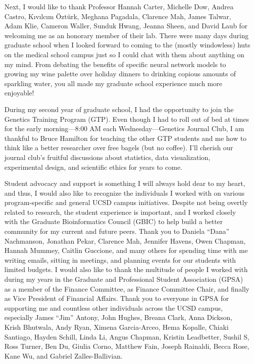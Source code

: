\documentclass[11pt]{formatting-template}
\begin{document}
\begin{acknowledgements}
	Next, I would like to thank Professor Hannah Carter, Michelle Dow, Andrea Castro, K{\i}v{\i}lc{\i}m {\"O}zt{\"u}rk, Meghana Pagadala, Clarence Mah, James Talwar, Adam Klie, Cameron Waller, Sunduk Hwang, Jeanna Sheen, and David Laub for welcoming me as an honorary member of their lab. There were many days during graduate school when I looked forward to coming to the (mostly windowless) huts on the medical school campus just so I could chat with them about anything on my mind. From debating the benefits of specific neural network models to growing my wine palette over holiday dinners to drinking copious amounts of sparkling water, you all made my graduate school experience much more enjoyable!  
	
	During my second year of graduate school, I had the opportunity to join the Genetics Training Program (GTP). Even though I had to roll out of bed at times for the early morning—8:00 AM each Wednesday—Genetics Journal Club, I am thankful to Bruce Hamilton for teaching the other GTP students and me how to think like a better researcher over free bagels (but no coffee). I’ll cherish our journal club's fruitful discussions about statistics, data visualization, experimental design, and scientific ethics for years to come.
	
	Student advocacy and support is something I will always hold dear to my heart, and thus, I would also like to recognize the individuals I worked with on various program-specific and general UCSD campus initiatives. Despite not being overtly related to research, the student experience is important, and I worked closely with the Graduate Bioinformatics Council (GBIC) to help build a better community for my current and future peers. Thank you to Daniela “Dana” Nachmanson, Jonathan Pekar, Clarence Mah, Jennifer Havens, Owen Chapman, Hannah Mummey, Caitlin Guccione, and many others for spending time with me writing emails, sitting in meetings, and planning events for our students with limited budgets. I would also like to thank the multitude of people I worked with during my years in the Graduate and Professional Student Association (GPSA) as a member of the Finance Committee, as Finance Committee Chair, and finally as Vice President of Financial Affairs. Thank you to everyone in GPSA for supporting me and countless other individuals across the UCSD campus, especially James “Jim” Antony, John Hughes, Breana Clark, Anna Dickson, Krish Bhutwala, Andy Ryan, Ximena Garcia-Arceo, Hema Kopalle, Chiaki Santiago, Hayden Schill, Linda Li, Angus Chapman, Kristin Leadbetter, Sushil S, Ross Turner, Ben Du, Giulia Corno, Matthew Fain, Joseph Rainaldi, Becca Rose, Kane Wu, and Gabriel Zalles-Ballivian. 
	

\end{acknowledgements}
\end{document}
